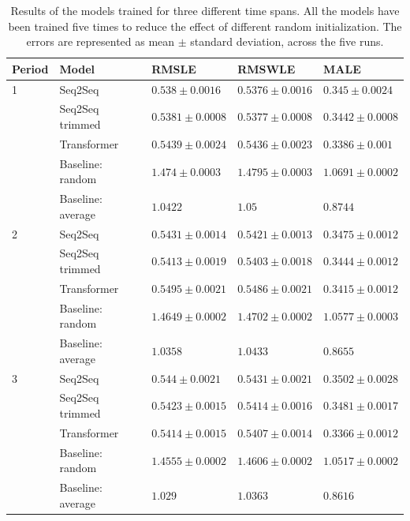 \documentclass{elsarticle}
\begin{document}
	\begin{table}[!h]
		\small
		\caption{Results of the models trained for three different time spans. All the models have been trained five times to reduce the effect of different random initialization. The errors are represented as mean $\pm$ standard deviation, across the five runs.}
		\label{tab:results}
		\centering
	\begin{tabular}{lllll}
		\hline
		Period & Model & RMSLE & RMSWLE & MALE\\
		\hline
		1&Seq2Seq & $ 0.538 \pm 0.0016 $  &  $ 0.5376 \pm 0.0016 $  &  $ 0.345 \pm 0.0024 $ \\
		
		&Seq2Seq trimmed & $ 0.5381 \pm 0.0008 $  &  $ 0.5377 \pm 0.0008 $  &  $ 0.3442 \pm 0.0008 $\\
		
		&Transformer & $ 0.5439 \pm 0.0024 $  &  $ 0.5436 \pm 0.0023 $  &  $ 0.3386 \pm 0.001 $\\
		
		&Baseline: random & $ 1.474 \pm 0.0003 $  &  $ 1.4795 \pm 0.0003 $  &  $ 1.0691 \pm 0.0002 $ \\
		
		&Baseline: average & $ 1.0422$  &  $ 1.05$  &  $ 0.8744$\\

		\hline
		2&Seq2Seq & $ 0.5431 \pm 0.0014 $  &  $ 0.5421 \pm 0.0013 $  &  $ 0.3475 \pm 0.0012 $ \\
		
		&Seq2Seq trimmed & $ 0.5413 \pm 0.0019 $  &  $ 0.5403 \pm 0.0018 $  &  $ 0.3444 \pm 0.0012 $ \\
		
		&Transformer & $ 0.5495 \pm 0.0021 $  &  $ 0.5486 \pm 0.0021 $  &  $ 0.3415 \pm 0.0012 $\\
		
		&Baseline: random & $ 1.4649 \pm 0.0002 $  &  $ 1.4702 \pm 0.0002 $  &  $ 1.0577 \pm 0.0003 $ \\
		
		&Baseline: average & $ 1.0358$  &  $ 1.0433$  &  $ 0.8655$\\
		\hline
		3&Seq2Seq & $ 0.544 \pm 0.0021 $  &  $ 0.5431 \pm 0.0021 $  &  $ 0.3502 \pm 0.0028 $ \\

		&Seq2Seq trimmed & $ 0.5423 \pm 0.0015 $  &  $ 0.5414 \pm 0.0016 $  &  $ 0.3481 \pm 0.0017 $ \\

		&Transformer & $ 0.5414 \pm 0.0015 $  &  $ 0.5407 \pm 0.0014 $  &  $ 0.3366 \pm 0.0012 $  \\

		&Baseline: random & $ 1.4555 \pm 0.0002 $  &  $ 1.4606 \pm 0.0002 $  &  $ 1.0517 \pm 0.0002 $ \\

		&Baseline: average & $ 1.029$  &  $ 1.0363 $  &  $ 0.8616$ \\
		\hline
	\end{tabular}
    \end{table}
\end{document}
